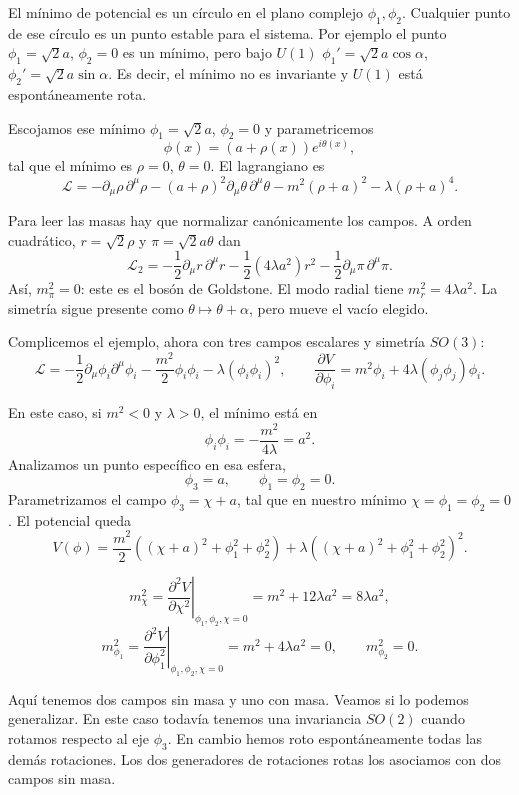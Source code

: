 \documentclass[11pt,a4paper]{article}
\newcommand{\concept}[1]{\textcolor{concept-green}{#1}}
\begin{document}
El mínimo de potencial es un círculo en el plano complejo $\phi_1,\phi_2$.
Cualquier punto de ese círculo es un punto estable para el sistema. Por ejemplo
el punto $\phi_1=\sqrt2a$, $\phi_2=0$ es un mínimo, pero bajo $U(1)$
$\phi_1'=\sqrt2a\cos\alpha$, $\phi_2'=\sqrt2a\sin\alpha$. Es decir, el mínimo no es invariante y
$U(1)$ está espontáneamente rota.

Escojamos ese mínimo $\phi_1=\sqrt2a$, $\phi_2=0$ y parametricemos
\[
  \phi(x)=(a+\rho(x))e^{i\theta(x)},
\]
tal que el mínimo es $\rho=0$, $\theta=0$. El lagrangiano es
\[
  \mathcal L
  =-\partial_\mu\rho\,\partial^\mu\rho
   -(a+\rho)^2\partial_\mu\theta\,\partial^\mu\theta
   -m^2(\rho+a)^2-\lambda(\rho+a)^4.
\]

Para leer las masas hay que normalizar canónicamente los campos.
A orden cuadrático, $r=\sqrt2\rho$ y $\pi=\sqrt2a\theta$ dan
\[
  \mathcal L_2
  =-\frac12\partial_\mu r\,\partial^\mu r
   -\frac12(4\lambda a^2)r^2
   -\frac12\partial_\mu\pi\,\partial^\mu\pi.
\]
Así, $m_\pi^2=0$: este es el \concept{bosón de Goldstone}.
El modo radial tiene $m_r^2=4\lambda a^2$.
La simetría sigue presente como $\theta\mapsto\theta+\alpha$,
pero mueve el vacío elegido.

Complicemos el ejemplo, ahora con tres campos escalares y simetría $SO(3)$:
\[
  \mathcal L
  =-\frac12\partial_\mu\phi_i\partial^\mu\phi_i
   -\frac{m^2}{2}\phi_i\phi_i
   -\lambda(\phi_i\phi_i)^2,
  \qquad
  \frac{\partial V}{\partial\phi_i}
  =m^2\phi_i+4\lambda(\phi_j\phi_j)\phi_i.
\]

En este caso, si $m^2<0$ y $\lambda>0$, el mínimo está en
\[
  \phi_i\phi_i=-\frac{m^2}{4\lambda}=a^2.
\]
Analizamos un punto específico en esa esfera,
\[
  \phi_3=a,
  \qquad
  \phi_1=\phi_2=0.
\]
Parametrizamos el campo $\phi_3=\chi+a$, tal que en nuestro mínimo
$\chi=\phi_1=\phi_2=0$. El potencial queda
\[
  V(\phi)
  =\frac{m^2}{2}\left((\chi+a)^2+\phi_1^2+\phi_2^2\right)
   +\lambda\left((\chi+a)^2+\phi_1^2+\phi_2^2\right)^2.
\]

\[
  m_\chi^2
  =\left.\frac{\partial^2V}{\partial\chi^2}\right|_{\phi_1,\phi_2,\chi=0}
  =m^2+12\lambda a^2=8\lambda a^2,
\]
\[
  m_{\phi_1}^2
  =\left.\frac{\partial^2V}{\partial\phi_1^2}\right|_{\phi_1,\phi_2,\chi=0}
  =m^2+4\lambda a^2=0,
  \qquad
  m_{\phi_2}^2=0.
\]

Aquí tenemos dos campos sin masa y uno con masa. Veamos si lo podemos
generalizar. En este caso todavía tenemos una invariancia $SO(2)$ cuando
rotamos respecto al eje $\phi_3$. En cambio hemos roto espontáneamente todas las
demás rotaciones. Los dos generadores de rotaciones rotas los asociamos con dos
campos sin masa.
\end{document}
